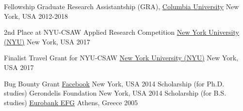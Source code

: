

\begin{cvhonors}

  \cvhonor
    {Fellowship} %
        {Graduate Research Assistantship (GRA), \href{https://engineering.columbia.edu/}{Columbia University}}
    {New York, USA}
    {2012-2018}

  \cvhonor
    {2nd Place at NYU-CSAW Applied Research Competition}
    {\href{http://engineering.nyu.edu/}{New York University (NYU)}}
    {New York, USA}
    {2017}

\cvhonor
    {Finalist Travel Grant for NYU-CSAW}
    {\href{http://engineering.nyu.edu/}{New York University (NYU)}}
    {New York, USA}
    {2017}

  \cvhonor
    {Bug Bounty Grant}
{\href{https://www.facebook.com/whitehat/thanks}{Facebook}} %
    {New York, USA} %
    {2014} %
  \cvhonor
{Scholarship (for Ph.D. studies)} %
    {Gerondelis Foundation}
    {New York, USA} %
    {2014} %
  \cvhonor
{Scholarship (for B.S. studies)} %
		{\href{https://www.eurobank.gr/}{Eurobank EFG}}
    {Athens, Greece}
    {2005}
\end{cvhonors}
